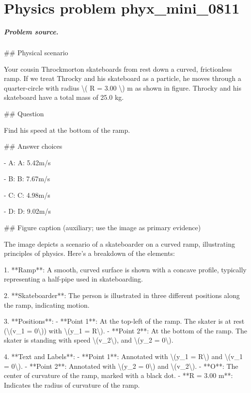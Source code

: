 
\chapter{Physics problem phyx\_mini\_0811}
\label{ch:PhyXMiniProblems_problem_phyx_mini_0811}

\paragraph{Problem source.}
\#\# Physical scenario

Your cousin Throckmorton skateboards from rest down a curved, frictionless ramp. If we treat Throcky and his skateboard as a particle, he moves through a quarter-circle with radius \textbackslash{}( R = 3.00 \textbackslash{}) m as shown in figure. Throcky and his skateboard have a total mass of 25.0 kg.

\#\# Question

Find his speed at the bottom of the ramp.

\#\# Answer choices

- A: A: 5.42m/s

- B: B: 7.67m/s

- C: C: 4.98m/s

- D: D: 9.02m/s

\#\# Figure caption (auxiliary; use the image as primary evidence)

The image depicts a scenario of a skateboarder on a curved ramp, illustrating principles of physics. Here’s a breakdown of the elements:

1. **Ramp**: A smooth, curved surface is shown with a concave profile, typically representing a half-pipe used in skateboarding.

2. **Skateboarder**: The person is illustrated in three different positions along the ramp, indicating motion. 

3. **Positions**:
   - **Point 1**: At the top-left of the ramp. The skater is at rest (\textbackslash{}(v\_1 = 0\textbackslash{})) with \textbackslash{}(y\_1 = R\textbackslash{}). 
   - **Point 2**: At the bottom of the ramp. The skater is standing with speed \textbackslash{}(v\_2\textbackslash{}), and \textbackslash{}(y\_2 = 0\textbackslash{}).

4. **Text and Labels**:
   - **Point 1**: Annotated with \textbackslash{}(y\_1 = R\textbackslash{}) and \textbackslash{}(v\_1 = 0\textbackslash{}). 
   - **Point 2**: Annotated with \textbackslash{}(y\_2 = 0\textbackslash{}) and \textbackslash{}(v\_2\textbackslash{}).
   - **O**: The center of curvature of the ramp, marked with a black dot.
   - **R = 3.00 m**: Indicates the radius of curvature of the ramp.

